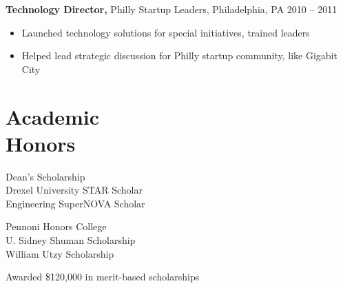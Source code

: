 \documentclass[margin]{res}
\begin{document}
\begin{resume}
	{\bf  Technology Director,}  Philly Startup Leaders, Philadelphia, PA \hfill 2010 -- 2011 
	\begin{itemize} \itemsep -2pt
	\item Launched technology solutions for special initiatives, trained leaders
	\item Helped lead strategic discussion for Philly startup community, like Gigabit City
	\end{itemize}


\section{Academic \\ Honors}
\begin{minipage}[t]{0.5\linewidth}
Dean's Scholarship \\
Drexel University STAR Scholar \\
Engineering SuperNOVA Scholar \\
\end{minipage}
\begin{minipage}[t]{0.5\linewidth}
Pennoni Honors College \\
U. Sidney Shuman Scholarship \\
William Utzy Scholarship \\
\end{minipage}

\vspace{-5mm}
{\centering Awarded \$120,000 in merit-based scholarships

}


\end{resume}
\end{document}
